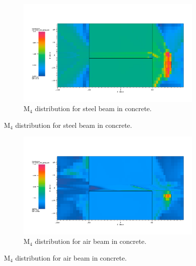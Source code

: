 \begin{figure}[htb!]
  \centering
  \begin{subfigure}[t]{\textwidth}
    \includegraphics[width=0.9\linewidth]{./chapters/characterization_probs/figures/char/prob_1/prob1M4G26.png}
    \caption{M$_4$ distribution for steel beam in concrete.}
    \label{fig:M4steel}
  \end{subfigure}
\end{figure}
\begin{figure}[htb!]\ContinuedFloat
  \centering
  \begin{subfigure}[t]{\textwidth}
    \includegraphics[width=0.9\linewidth]{./chapters/characterization_probs/figures/char/prob1v1/prob1v1M4G26.png}
    \caption{M$_4$ distribution for air beam in concrete.}
    \label{fig:M4air}
  \end{subfigure}
\end{figure}
